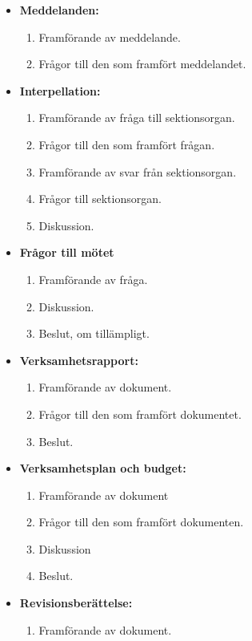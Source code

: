 \documentclass[11pt, includeaddress]{classes/cthit}
\begin{document}
\begin{itemize}
    \item \textbf{Meddelanden:}
    \begin{enumerate}
        \item Framförande av meddelande.
        \item Frågor till den som framfört meddelandet.
    \end{enumerate}
    \item \textbf{Interpellation:}
    \begin{enumerate}
        \item Framförande av fråga till sektionsorgan.
        \item Frågor till den som framfört frågan.
        \item Framförande av svar från sektionsorgan.
        \item Frågor till sektionsorgan.
        \item Diskussion.
    \end{enumerate}
    \item \textbf{Frågor till mötet}
    \begin{enumerate}
        \item Framförande av fråga.
        \item Diskussion.
        \item Beslut, om tillämpligt.
    \end{enumerate}
    \item \textbf{Verksamhetsrapport:}
    \begin{enumerate}
        \item Framförande av dokument.
        \item Frågor till den som framfört dokumentet.
        \item Beslut.
    \end{enumerate}
    \item \textbf{Verksamhetsplan och budget:}
    \begin{enumerate}
        \item Framförande av dokument
        \item Frågor till den som framfört dokumenten.
        \item Diskussion
        \item Beslut.
    \end{enumerate}
    \item \textbf{Revisionsberättelse:}
    \begin{enumerate}
        \item Framförande av dokument.

\end{enumerate}
\end{itemize}
\end{document}
